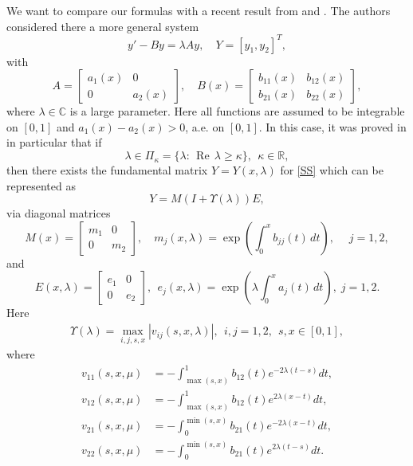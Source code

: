 \documentclass[11pt]{amsart}
\theoremstyle{plain}
\theoremstyle{definition}
\theoremstyle{remark}
\numberwithin{equation}{section}
\renewcommand\Re{\operatorname{Re}}
\begin{document}
We want to compare our formulas with a recent result from  \cite{SaKos21} and \cite{SaKos}. The authors considered there a more general system
\begin{equation}\label{SS}
y'-By=\lambda Ay,\quad Y=[y_1,y_2]^T,
\end{equation}
with
\[
A=\left[\begin{array}{cc}
a_1(x) & 0\\
0 &a_2(x)
\end{array}
\right],\quad
B(x)=\left[\begin{array}{cc}
b_{11}(x) & b_{12}(x)\\
b_{21}(x) & b_{22}(x)
\end{array}
\right],
\]
where $\lambda\in \mathbb{C}$ is a large parameter.
Here all functions are assumed to be integrable on $[0,1]$ and $a_1(x)-a_2(x)>0$, a.e.
on $[0,1].$
In this case, it was proved in \cite{SaKos} in particular that
 if
\[
\lambda\in \Pi_{\kappa}=
\{\lambda:\,\Re\,\lambda\ge \kappa\}, \ \ \kappa\in \mathbb{R},
\]
then there exists the
fundamental matrix
$Y=Y(x,\lambda)$ for \eqref{SS} which can be represented  as
\begin{equation}\label{KSAs0}
Y=M(I+\Upsilon(\lambda))E,
\end{equation}
via diagonal matrices
\[
M(x)=\left[\begin{array}{cc}
m_1 & 0\\
0 & m_2
\end{array}
\right],\quad
m_j(x,\lambda)=\exp{\left(\int_0^x b_{jj}(t)\,dt\right)},\; \quad j=1,2,
\]
and
\[E(x,\lambda)=\left[\begin{array}{cc}
e_1 & 0\\
0 & e_2
\end{array}
\right], \ \
e_j(x,\lambda)=\exp{\left(\lambda\int_0^x a_{j}(t)\,dt\right)},\; j=1,2.
\]
Here
\begin{align}
\Upsilon(\lambda)=\max_{i,j,s,x}|v_{ij}(s,x,\lambda)|, \ \ i,j=1,2, \ \ s,x \in [0,1],
\end{align}
where
\begin{align*}
v_{11}(s,x,\mu)& = - \int_{\max(s,x)}^1 b_{12}(t)e^{-2\lambda(t-s)}dt,\\
v_{12}(s,x,\mu)& = - \int_{\max(s,x)}^1 b_{12}(t)e^{2\lambda(x-t)}dt,\\
v_{21}(s,x,\mu)& = - \int^{\min(s,x)}_0 b_{21}(t)e^{-2\lambda(x-t)}dt,\\
v_{22}(s,x,\mu)& = - \int^{\min(s,x)}_0 b_{21}(t)e^{2\lambda(t-s)}dt.
\end{align*}
\end{document}
